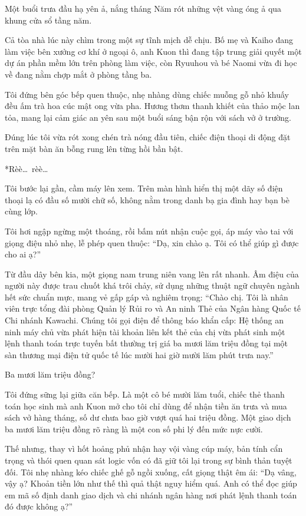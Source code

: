 \documentclass[../main.tex]{subfiles}
\begin{document}

Một buổi trưa đầu hạ yên ả, nắng tháng Năm rót những vệt vàng óng ả qua khung cửa sổ tầng năm.

Cả tòa nhà lúc này chìm trong một sự tĩnh mịch dễ chịu. Bố mẹ và Kaiho đang làm việc bên xưởng cơ khí ở ngoại ô, anh Kuon thì đang tập trung giải quyết một dự án phần mềm lớn trên phòng làm việc, còn Ryuuhou và bé Naomi vừa đi học về đang nằm chợp mắt ở phòng tầng ba.

Tôi đứng bên góc bếp quen thuộc, nhẹ nhàng dùng chiếc muỗng gỗ nhỏ khuấy đều ấm trà hoa cúc mật ong vừa pha. Hương thơm thanh khiết của thảo mộc lan tỏa, mang lại cảm giác an yên sau một buổi sáng bận rộn với sách vở ở trường.

Đúng lúc tôi vừa rót xong chén trà nóng đầu tiên, chiếc điện thoại di động đặt trên mặt bàn ăn bỗng rung lên từng hồi bần bật.

*Rèè\dots\ rèè\dots*

Tôi bước lại gần, cầm máy lên xem. Trên màn hình hiển thị một dãy số điện thoại lạ có đầu số mười chữ số, không nằm trong danh bạ gia đình hay bạn bè cùng lớp.

Tôi hơi ngập ngừng một thoáng, rồi bấm nút nhận cuộc gọi, áp máy vào tai với giọng điệu nhỏ nhẹ, lễ phép quen thuộc: ``Dạ, xin chào ạ. Tôi có thể giúp gì được cho ai ạ?''

Từ đầu dây bên kia, một giọng nam trung niên vang lên rất nhanh. Âm điệu của người này được trau chuốt khá trôi chảy, sử dụng những thuật ngữ chuyên ngành hết sức chuẩn mực, mang vẻ gấp gáp và nghiêm trọng: ``Chào chị. Tôi là nhân viên trực tổng đài phòng Quản lý Rủi ro và An ninh Thẻ của Ngân hàng Quốc tế Chi nhánh Kawachi. Chúng tôi gọi điện để thông báo khẩn cấp: Hệ thống an ninh máy chủ vừa phát hiện tài khoản liên kết thẻ của chị vừa phát sinh một lệnh thanh toán trực tuyến bất thường trị giá ba mươi lăm triệu đồng tại một sàn thương mại điện tử quốc tế lúc mười hai giờ mười lăm phút trưa nay.''

Ba mươi lăm triệu đồng?

Tôi đứng sững lại giữa căn bếp. Là một cô bé mười lăm tuổi, chiếc thẻ thanh toán học sinh mà anh Kuon mở cho tôi chỉ dùng để nhận tiền ăn trưa và mua sách vở hàng tháng, số dư chưa bao giờ vượt quá hai triệu đồng. Một giao dịch ba mươi lăm triệu đồng rõ ràng là một con số phi lý đến mức nực cười.

Thế nhưng, thay vì hốt hoảng phủ nhận hay vội vàng cúp máy, bản tính cẩn trọng và thói quen quan sát logic vốn có đã giữ tôi lại trong sự bình thản tuyệt đối. Tôi nhẹ nhàng kéo chiếc ghế gỗ ngồi xuống, cất giọng thật êm ái: ``Dạ vâng, vậy ạ? Khoản tiền lớn như thế thì quả thật nguy hiểm quá. Anh có thể đọc giúp em mã số định danh giao dịch và chi nhánh ngân hàng nơi phát lệnh thanh toán đó được không ạ?''
\end{document}
